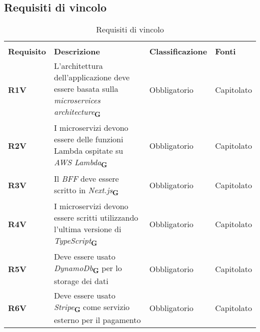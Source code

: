 \newpage
\subsection{Requisiti di vincolo}
\begin{center}
    \centering
    \renewcommand{\arraystretch}{1.8}
    \label{tab:RequisitiVincolo}
    \begin{longtable}[!h]{p{50px} p{200px} p{100px} p{50px}}
        \rowcolor{white}\caption{Requisiti di vincolo}                                                                                                                                                                                               \\
        \rowcolor{logo!70} \textbf{Requisito} & \textbf{Descrizione}                                                                                                                                     & \textbf{Classificazione} & \textbf{Fonti} \\
        \textbf{R1V}                          & L'architettura dell'applicazione deve essere basata sulla \textit{microservices architecture}\textsubscript{\textbf{G}}                                  & Obbligatorio             & Capitolato     \\
        \textbf{R2V}                          & I microservizi devono essere delle funzioni \newline Lambda ospitate su \textit{AWS Lambda}\textsubscript{\textbf{G}}                                    & Obbligatorio             & Capitolato     \\
        \textbf{R3V}                          & Il \textit{BFF} deve essere scritto in \textit{Next.js}\textsubscript{\textbf{G}}                                                                        & Obbligatorio             & Capitolato     \\
        \textbf{R4V}                          & I microservizi devono essere scritti utilizzando l'ultima versione di \textit{TypeScript}\textsubscript{\textbf{G}}                                      & Obbligatorio             & Capitolato     \\
        \textbf{R5V}                          & Deve essere usato \textit{DynamoDb}\textsubscript{\textbf{G}} per lo storage dei dati                                                                    & Obbligatorio             & Capitolato     \\
        \textbf{R6V}                          & Deve essere usato \textit{Stripe}\textsubscript{\textbf{G}} come servizio esterno per il pagamento                                                       & Obbligatorio             & Capitolato     \\

\end{longtable}
\end{center}
